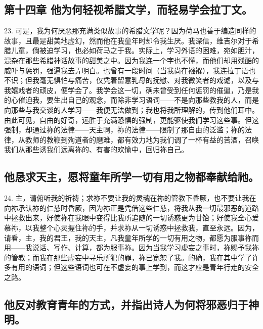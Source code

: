 
\subsection{第十四章 他为何轻视希腊文学，而轻易学会拉丁文。}

23. 可是，我为何厌恶那充满类似故事的希腊文学呢？因为荷马也善于编造同样的故事，且最是甜美地虚幻，然而他在我童年时却令我生厌。我深信，维吉尔对于希腊儿童，倘被迫学习，也必如荷马之于我。实际上，学习外语的困难，宛如胆汁，混杂在那些希腊神话故事的甜美之中。因为我连一个字也不懂，而他们却用残酷的威吓与惩罚，强逼我去弄明白。也曾有一段时间（当我尚在襁褓），我连拉丁语也不识；但我毫无惧怕与痛苦，仅凭着留意乳母的抚慰、对我微笑者的戏谑，以及与我嬉戏者的顽皮，便学会了。我学会这一切，确未曾受到任何惩罚的催逼，乃是我的心催迫我，要生出自己的观念，而除非学习语词——不是向那些教我的人，而是向那些与我交谈的人学习——我便无法做到；我也将我所理解的，传到他们耳中。由此可见，自由的好奇，远胜于充满恐惧的强制，更能驱使我们学习这些事。但这强制，却通过祢的法律——天主啊，祢的法律——限制了那自由的泛滥；祢的法律，从教师的教鞭到殉道者的磨难，都有效力地为我们调了一杯有益的苦酒，召唤我们从那些诱我们远离祢的、有害的欢愉中，回归祢自己。\par


\subsection{他恳求天主，愿将童年所学一切有用之物都奉献给祂。}

24. 主，请俯听我的祈祷；求祢不要让我的灵魂在祢的管教下昏厥，也不要让我在向祢承认祢的仁慈时昏厥，因为祢正是凭借这些仁慈，将我从我一切最邪恶的道路中拯救出来，好使祢在我眼中变得比我所追随的一切诱惑更为甘饴；好使我全心爱慕祢，以我整个心灵握住祢的手，并求祢从一切诱惑中拯救我，直至永远。因为，请看，主，我的君王，我的天主，凡我童年所学的一切有用之物，都愿为服事祢而用——我说话、写作、计算，都为服事祢。因为当我学习虚妄之事时，祢赐予我祢的管教；而我在那些虚妄中寻乐所犯的罪，祢已宽恕了我。的确，我在其中学了许多有用的语词；但这些语词也可在不虚妄的事上学到，而这才应是青年行走的安全之路。\par


\subsection{他反对教育青年的方式，并指出诗人为何将邪恶归于神明。}

